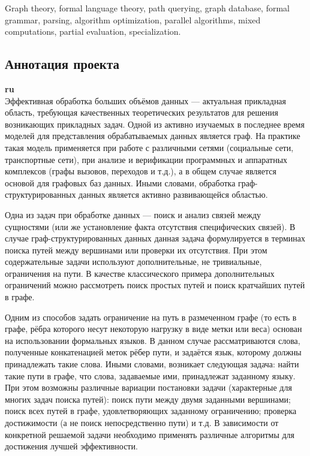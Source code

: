 \documentclass[12pt]{article}  %
\theoremstyle{remark}
\begin{document}
Graph theory, formal language theory, path querying, graph database, formal grammar, parsing, algorithm optimization, parallel algorithms, mixed computations, partial evaluation, specialization.



\subsection{Аннотация проекта}
\textbf{ru}\\
%
Эффективная обработка больших объёмов данных — актуальная прикладная область, требующая качественных теоретических результатов для решения возникающих прикладных задач. Одной из активно изучаемых в последнее время моделей для представления обрабатываемых данных является граф. На практике такая модель применяется при работе с различными сетями (социальные сети, транспортные сети), при анализе и верификации программных и аппаратных комплексов (графы вызовов, переходов и т.д.), а в общем случае является основой для графовых баз данных. Иными словами, обработка граф-структурированных данных является активно развивающейся областью.

Одна из задач при обработке данных — поиск и анализ связей между сущностями (или же установление факта отсутствия специфических связей). В случае граф-структурированных данных данная задача формулируется в терминах поиска путей между вершинами или проверки их отсутствия. При этом содержательные задачи используют дополнительные, не тривиальные, ограничения на пути. В качестве классического примера дополнительных ограничений можно рассмотреть поиск простых путей и поиск кратчайших путей в графе.

Одним из способов задать ограничение на путь в размеченном графе (то есть в графе, рёбра которого несут некоторую нагрузку в виде метки или веса) основан на использовании формальных языков. В данном случае рассматриваются слова, полученные конкатенацией меток рёбер пути, и задаётся язык, которому должны принадлежать такие слова. Иными словами, возникает следующая задача: найти такие пути в графе, что слова, задаваемые ими, принадлежат заданному языку. При этом возможны различные вариации постановки задачи (характерные для многих задач поиска путей): поиск пути между двумя заданными вершинами; поиск всех путей в графе, удовлетворяющих заданному ограничению; проверка достижимости (а не поиск непосредственно пути) и т.д. В зависимости от конкретной решаемой задачи необходимо применять различные алгоритмы для достижения лучшей эффективности.
\end{document}
